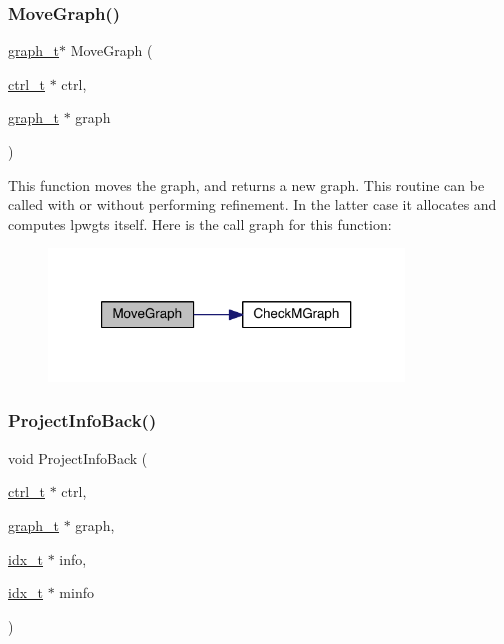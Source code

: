 \mbox{\label{a00377_a1cb4b51c6bbdb0cc5c28fd554121c7e1}} 
\subsubsection{\texorpdfstring{Move\+Graph()}{MoveGraph()}}
{\footnotesize\ttfamily \hyperlink{a00734}{graph\+\_\+t}$\ast$ Move\+Graph (\begin{DoxyParamCaption}\item[{\hyperlink{a00742}{ctrl\+\_\+t} $\ast$}]{ctrl,  }\item[{\hyperlink{a00734}{graph\+\_\+t} $\ast$}]{graph }\end{DoxyParamCaption})}

This function moves the graph, and returns a new graph. This routine can be called with or without performing refinement. In the latter case it allocates and computes lpwgts itself. Here is the call graph for this function\+:\nopagebreak
\begin{figure}[H]
\begin{center}
\leavevmode
\includegraphics[width=268pt]{a00377_a1cb4b51c6bbdb0cc5c28fd554121c7e1_cgraph}
\end{center}
\end{figure}
\mbox{\label{a00377_ab7eeb680cd7f08cdfa57220b05ed84dd}} 
\subsubsection{\texorpdfstring{Project\+Info\+Back()}{ProjectInfoBack()}}
{\footnotesize\ttfamily void Project\+Info\+Back (\begin{DoxyParamCaption}\item[{\hyperlink{a00742}{ctrl\+\_\+t} $\ast$}]{ctrl,  }\item[{\hyperlink{a00734}{graph\+\_\+t} $\ast$}]{graph,  }\item[{\hyperlink{a00876_aaa5262be3e700770163401acb0150f52}{idx\+\_\+t} $\ast$}]{info,  }\item[{\hyperlink{a00876_aaa5262be3e700770163401acb0150f52}{idx\+\_\+t} $\ast$}]{minfo }\end{DoxyParamCaption})}


